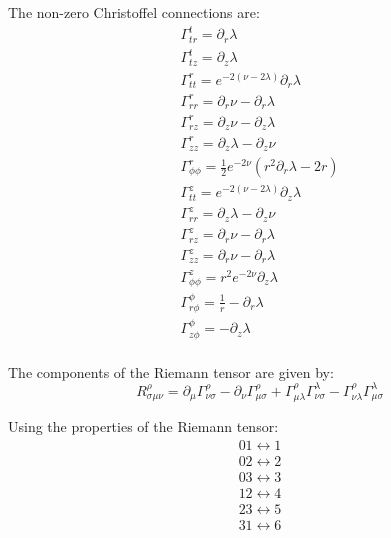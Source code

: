 \documentclass{article}
\begin{document}
The non-zero Christoffel connections are:
\begin{equation}
\begin{array}{l}
\Gamma_{tr}^{t}=\partial_{r}\lambda\\
\Gamma_{tz}^{t}=\partial_{z}\lambda\\
\Gamma_{tt}^{r}=e^{-2\left(\nu-2\lambda\right)}\partial_{r}\lambda\\
\Gamma_{rr}^{r}=\partial_{r}\nu-\partial_{r}\lambda\\
\Gamma_{rz}^{r}=\partial_{z}\nu-\partial_{z}\lambda\\
\Gamma_{zz}^{r}=\partial_{z}\lambda-\partial_{z}\nu\\
\Gamma_{\phi\phi}^{r}=\frac{1}{2}e^{-2\nu}\left(r^{2}\partial_{r}\lambda-2r\right)\\
\Gamma_{tt}^{z}=e^{-2\left(\nu-2\lambda\right)}\partial_{z}\lambda\\
\Gamma_{rr}^{z}=\partial_{z}\lambda-\partial_{z}\nu\\
\Gamma_{rz}^{z}=\partial_{r}\nu-\partial_{r}\lambda\\ 
\Gamma_{zz}^{z}=\partial_{r}\nu-\partial_{r}\lambda\\
\Gamma_{\phi\phi}^{z}=r^{2}e^{-2\nu}\partial_{z}\lambda\\
\Gamma_{r\phi}^{\phi}=\frac{1}{r}-\partial_{r}\lambda\\
\Gamma_{z\phi}^{\phi}=-\partial_{z}\lambda\\
\end{array}
\end{equation}

The components of the Riemann tensor are given by:
\begin{equation}
R_{\sigma\mu\nu}^{\rho}=\partial_{\mu}\Gamma_{\nu\sigma}^{\rho}-\partial_{\nu}\Gamma_{\mu\sigma}^{\rho}+\Gamma_{\mu\lambda}^{\rho}\Gamma_{\nu\sigma}^{\lambda}-\Gamma_{\nu\lambda}^{\rho}\Gamma_{\mu\sigma}^{\lambda}
\end{equation}

Using the properties of the Riemann tensor:
\begin{equation}
\begin{array}{c}
01\longleftrightarrow1\\
02\longleftrightarrow2\\
03\longleftrightarrow3\\
12\longleftrightarrow4\\
23\longleftrightarrow5\\
31\longleftrightarrow6\\
\end{array}
\end{equation}
\end{document}

